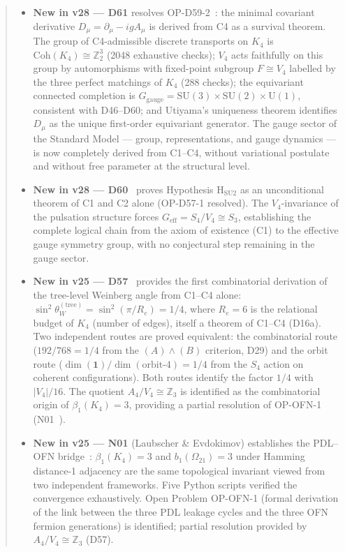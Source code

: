 \documentclass[11pt,a4paper]{article}
\theoremstyle{plain}
\theoremstyle{definition}
\theoremstyle{remark}
\newcommand{\Kfour}{K_4}
\begin{document}
\begin{abstract}
\begin{itemize}
\item \textbf{New in v28 --- D61} resolves OP-D59-2~\cite{D61}: the minimal covariant derivative $D_\mu = \partial_\mu - igA_\mu$ is derived from C4 as a survival theorem. The group of C4-admissible discrete transports on $K_4$ is $\mathrm{Coh}(K_4) \cong \mathbb{Z}_2^3$ (2048 exhaustive checks); $V_4$ acts faithfully on this group by automorphisms with fixed-point subgroup $F \cong V_4$ labelled by the three perfect matchings of $K_4$ (288 checks); the equivariant connected completion is $G_\mathrm{gauge} = \mathrm{SU}(3)\times\mathrm{SU}(2)\times\mathrm{U}(1)$, consistent with D46--D60; and Utiyama's uniqueness theorem identifies $D_\mu$ as the unique first-order equivariant generator. The gauge sector of the Standard Model --- group, representations, and gauge dynamics --- is now completely derived from C1--C4, without variational postulate and without free parameter at the structural level.
\item \textbf{New in v28 --- D60}~\cite{D60} proves Hypothesis H$_{\mathrm{SU2}}$ as an unconditional theorem of C1 and C2 alone (OP-D57-1 resolved). The $V_4$-invariance of the pulsation structure forces $G_{\mathrm{eff}} = S_4/V_4 \cong S_3$, establishing the complete logical chain from the axiom of existence (C1) to the effective gauge symmetry group, with no conjectural step remaining in the gauge sector.
\item \textbf{New in v25 --- D57}~\cite{D57} provides the first combinatorial derivation of the tree-level Weinberg angle from C1--C4 alone: $\sin^2\theta_W^{(\mathrm{tree})} = \sin^2(\pi/R_e) = 1/4$, where $R_e = 6$ is the relational budget of $\Kfour$ (number of edges), itself a theorem of C1--C4 (D16a). Two independent routes are proved equivalent: the combinatorial route ($192/768 = 1/4$ from the $(A)\wedge(B)$ criterion, D29) and the orbit route ($\dim(\mathbf{1})/\dim(\text{orbit-4}) = 1/4$ from the $S_4$ action on coherent configurations). Both routes identify the factor $1/4$ with $|V_4|/16$. The quotient $A_4/V_4 \cong \mathbb{Z}_3$ is identified as the combinatorial origin of $\beta_1(K_4) = 3$, providing a partial resolution of OP-OFN-1 (N01~\cite{N01}).
\item \textbf{New in v25 --- N01} (Laubscher \& Evdokimov) establishes the PDL--OFN bridge~\cite{N01}: $\beta_1(\Kfour)=3$ and $b_1(\Omega_{21})=3$ under Hamming distance-1 adjacency are the same topological invariant viewed from two independent frameworks. Five Python scripts verified the convergence exhaustively. Open Problem OP-OFN-1 (formal derivation of the link between the three PDL leakage cycles and the three OFN fermion generations) is identified; partial resolution provided by $A_4/V_4 \cong \mathbb{Z}_3$ (D57).

\end{itemize}
\end{abstract}
\end{document}
